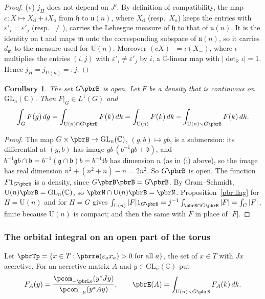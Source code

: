 \documentclass[10pt]{amsart}
\newtheorem{corollary}[theorem]{Corollary}
\theoremstyle{definition}
\theoremstyle{remark}
\newcommand{\C}{\mathbb C}
\newcommand{\R}{\mathbb R}
\providecommand{\auU}{\mathrm U}
\begin{document}
\begin{proof}
(v) $j_H$ does not depend on $J'$. By definition of compatibility, the map $c\colon X\mapsto X_{\mathrm
d}+iX_{\mathrm o}$ from $\mathfrak h$ to $\mathfrak u(n)$, where $X_{\mathrm d}$ (resp.\ $X_{\mathrm o}$)
keeps the entries with $\varepsilon'_i=\varepsilon'_j$ (resp.\ $\ne$), carries the Lebesgue measure of
$\mathfrak h$ to that of $\mathfrak u(n)$. It is the identity on $\mathfrak t$ and maps $\mathfrak m$
onto the corresponding subspace of $\mathfrak u(n)$, so it carries $d_{\mathfrak m}$ to the measure
used for $\auU(n)$. Moreover $(cX)_-=\iota(X_-)$, where $\iota$ multiplies the entries $(i,j)$ with
$\varepsilon'_i\ne\varepsilon'_j$ by $i$, a $\C$-linear map with $|\det_\R\iota|=1$. Hence
$j_H=j_{\auU(n)}=:j$.
\end{proof}

\begin{corollary}\label{pbr:flagG}
The set $G\pbrB$ is open. Let $F$ be a density that is continuous on $\mathrm{GL}_n(\C)$. Then
$F|_G\in L^1(G)$ and
\[
\int_GF(g)\,dg=\int_{\auU(n)\cap G\pbrB}F(k)\,dk=\int_{\auU(n)}F(k)\,dk-\int_{\auU(n)\smallsetminus
G\pbrB}F(k)\,dk .
\]
\end{corollary}
\begin{proof}
The map $G\times\pbrB\to\mathrm{GL}_n(\C)$, $(g,b)\mapsto gb$, is a submersion: its differential at
$(g,b)$ has image $gb\,(b^{-1}\mathfrak gb+\mathfrak b)$, and $b^{-1}\mathfrak gb\cap\mathfrak b=
b^{-1}(\mathfrak g\cap\mathfrak b)b=b^{-1}\mathfrak tb$ has dimension $n$ (as in (i) above), so the
image has real dimension $n^2+(n^2+n)-n=2n^2$. So $G\pbrB$ is open. The function $F1_{G\pbrB}$ is a
density, since $G\pbrB\pbrB=G\pbrB$. By Gram--Schmidt, $\auU(n)\pbrB=\mathrm{GL}_n(\C)$, so
$\pbrN\cap\auU(n)\pbrB=\pbrN$. Proposition~\ref{pbr:flag} for $H=\auU(n)$ and for $H=G$ gives
$\int_{\auU(n)}|F|1_{G\pbrB}=j^{-1}\int_{\pbrN\cap G\pbrB}|F|=\int_G|F|$, finite because $\auU(n)$ is
compact; and then the same with $F$ in place of $|F|$.
\end{proof}

\subsubsection{The orbital integral on an open part of the torus}\label{pbr:ss-open}

Let $\pbrTp=\{x\in T:\pbrre(\varepsilon_ax_a)>0\text{ for all }a\}$, the set of $x\in T$ with $Jx$
accretive. For an accretive matrix $A$ and $y\in\mathrm{GL}_n(\C)$ put
\[
F_A(y)=\frac{\pcom_{-\pbrLo}(y^*Jy)}{\pcom_{-\mu}(y^*Ay)},\qquad \pbrE(A)=\int_{\auU(n)\smallsetminus
G\pbrB}F_A(k)\,dk .
\]
\end{document}
